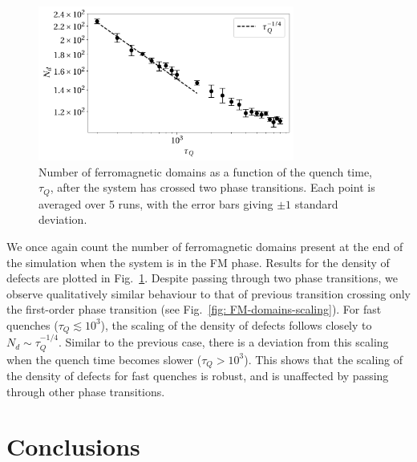 \begin{figure}
    \centering
    \includegraphics[width=0.75\textwidth]{gfx/ch-spin1/polar-BA-FM_domains.pdf}
    \caption{\label{fig: polar-ba-fm-defects}Number of ferromagnetic domains as
    a function of the quench time, \(\tau_Q\), after the system has crossed two
    phase transitions.
    Each point is averaged over 5 runs, with the error bars giving \(\pm 1\)
    standard deviation.}
\end{figure}
We once again count the number of ferromagnetic domains present at the end of
the simulation when the system is in the FM phase.
Results for the density of defects are plotted in
Fig.~\ref{fig: polar-ba-fm-defects}.
Despite passing through two phase transitions, we observe qualitatively similar
behaviour to that of previous transition crossing only the first-order phase
transition (see Fig.~\ref{fig: FM-domains-scaling}).
For fast quenches (\(\tau_Q \lesssim 10^3 \)), the scaling of the density of
defects follows closely to \(N_d \sim \tau_Q^{-1/4}\).
Similar to the previous case, there is a deviation from this scaling when the
quench time becomes slower (\(\tau_Q > 10^3\)).
This shows that the scaling of the density of defects for fast quenches is
robust, and is unaffected by passing through other phase transitions.

\section{Conclusions}

